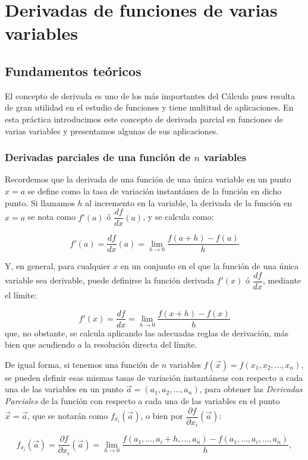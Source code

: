 \chapter{Derivadas de funciones de varias variables}

\section{Fundamentos teóricos}
El concepto de derivada es uno de los más importantes del Cálculo
pues resulta de gran utilidad en el estudio de funciones y tiene
multitud de aplicaciones. En esta práctica introducimos este
concepto de derivada parcial en funciones de varias variables y presentamos algunas de sus aplicaciones.

\subsection{Derivadas parciales de una función de $n$ variables}
Recordemos que la derivada de una función de una única variable en
un punto $x=a$ se define como la tasa de variación instantánea de la
función en dicho punto. Si llamamos $h$ al incremento en la
variable, la derivada de la función en $x=a$ se nota como $f'(a)$ ó
$\dfrac{{df}} {{dx}}(a)$, y se calcula como:

\[
f'(a) = \frac{df}{dx}(a) = \mathop {\lim
}\limits_{h \to 0} \frac{{f(a + h) - f(a)}} {h}
\]

Y, en general, para cualquier $x$ en un conjunto en el que la
función de una única variable sea derivable, puede definirse la
función derivada $f'(x)$ ó $\dfrac{df}{dx}$,
mediante el límite:

\[
f'(x) = \frac{df}{dx} = \mathop {\lim }\limits_{h
\to 0} \frac{{f(x + h) - f(x)}} {h}
\]
que, no obstante, se calcula aplicando las adecuadas reglas de
derivación, más bien que acudiendo a la resolución directa del
límite.

De igual forma, si tenemos una función de $n$ variables
$f(\vec{x})=f(x_1,x_2,...,x_n)$, se pueden definir esas mismas tasas
de variación instantáneas con respecto a cada una de las variables
en un punto $\vec{a}=(a_1,a_2,...,a_n)$, para obtener las
\emph{Derivadas Parciales} de la función con respecto a cada una de
las variables en el punto $\vec{x}=\vec{a}$, que se notarán como
$f_{x_i}(\vec{a})$, o bien por $\dfrac{\partial f}{\partial
x_i}(\vec{a})$:

\[
f_{x_i}(\vec{a})=\dfrac{\partial f}{\partial
x_i}(\vec{a})=\lim_{h\rightarrow
0}\frac{f(a_1,\ldots,a_i+h,\ldots,a_n)-f(a_1,\ldots,a_i,\ldots,a_n)}{h},
\]

